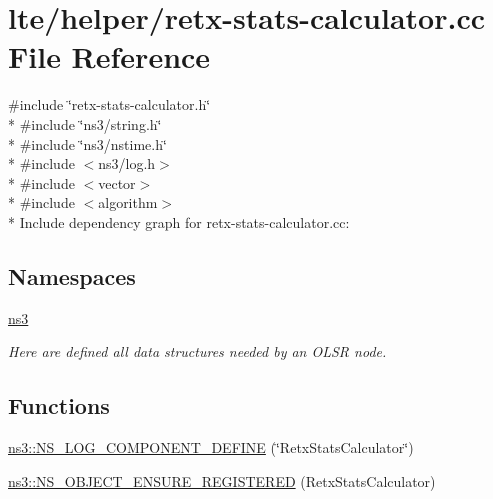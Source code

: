 \hypertarget{retx-stats-calculator_8cc}{}\section{lte/helper/retx-\/stats-\/calculator.cc File Reference}
\label{retx-stats-calculator_8cc}
{\ttfamily \#include \char`\"{}retx-\/stats-\/calculator.\+h\char`\"{}}\\*
{\ttfamily \#include \char`\"{}ns3/string.\+h\char`\"{}}\\*
{\ttfamily \#include \char`\"{}ns3/nstime.\+h\char`\"{}}\\*
{\ttfamily \#include $<$ns3/log.\+h$>$}\\*
{\ttfamily \#include $<$vector$>$}\\*
{\ttfamily \#include $<$algorithm$>$}\\*
Include dependency graph for retx-\/stats-\/calculator.cc\+:
\subsection*{Namespaces}
\begin{DoxyCompactItemize}
\item 
 \hyperlink{namespacens3}{ns3}
\begin{DoxyCompactList}\small\item\em Here are defined all data structures needed by an O\+L\+SR node. \end{DoxyCompactList}\end{DoxyCompactItemize}
\subsection*{Functions}
\begin{DoxyCompactItemize}
\item 
\hyperlink{namespacens3_a82a837878edf77617bbce32d9df7dfce}{ns3\+::\+N\+S\+\_\+\+L\+O\+G\+\_\+\+C\+O\+M\+P\+O\+N\+E\+N\+T\+\_\+\+D\+E\+F\+I\+NE} (\char`\"{}Retx\+Stats\+Calculator\char`\"{})
\item 
\hyperlink{namespacens3_a9f824f119fde4806021fb9a08f2cc7a3}{ns3\+::\+N\+S\+\_\+\+O\+B\+J\+E\+C\+T\+\_\+\+E\+N\+S\+U\+R\+E\+\_\+\+R\+E\+G\+I\+S\+T\+E\+R\+ED} (Retx\+Stats\+Calculator)
\end{DoxyCompactItemize}
